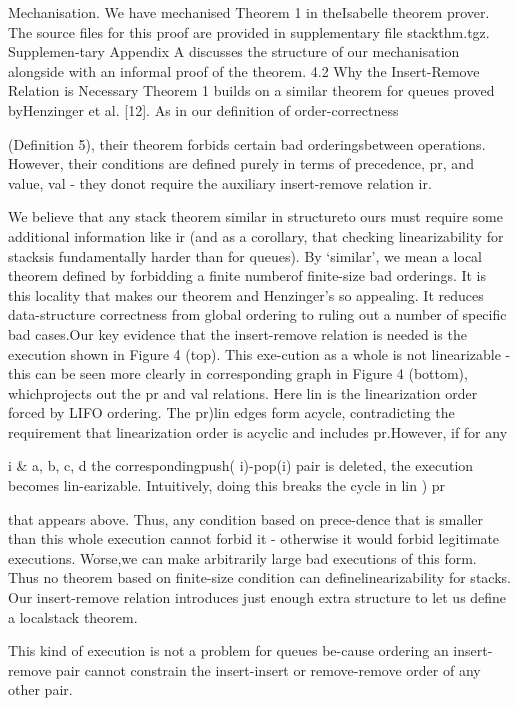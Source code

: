 Mechanisation. We have mechanised Theorem 1 in theIsabelle theorem prover. The source files for this proof are
provided in supplementary file stackthm.tgz. Supplemen-tary Appendix A discusses the structure of our mechanisation alongside with an informal proof of the theorem.
4.2 Why the Insert-Remove Relation is Necessary
Theorem 1 builds on a similar theorem for queues proved byHenzinger et al. [12]. As in our definition of order-correctness

(Definition 5), their theorem forbids certain bad orderingsbetween operations. However, their conditions are defined
purely in terms of precedence, pr, and value, val - they donot require the auxiliary insert-remove relation ir.

We believe that any stack theorem similar in structureto ours must require some additional information like ir
(and as a corollary, that checking linearizability for stacksis fundamentally harder than for queues). By `similar', we
mean a local theorem defined by forbidding a finite numberof finite-size bad orderings. It is this locality that makes
our theorem and Henzinger's so appealing. It reduces data-structure correctness from global ordering to ruling out a
number of specific bad cases.Our key evidence that the insert-remove relation is
needed is the execution shown in Figure 4 (top). This exe-cution as a whole is not linearizable - this can be seen more
clearly in corresponding graph in Figure 4 (bottom), whichprojects out the pr and val relations. Here lin is the linearization order forced by LIFO ordering. The pr)lin edges form acycle, contradicting the requirement that linearization order
is acyclic and includes pr.However, if for any

i & {a, b, c, d} the correspondingpush(
i)-pop(i) pair is deleted, the execution becomes lin-earizable. Intuitively, doing this breaks the cycle in lin ) pr

that appears above. Thus, any condition based on prece-dence that is smaller than this whole execution cannot forbid
it - otherwise it would forbid legitimate executions. Worse,we can make arbitrarily large bad executions of this form.
Thus no theorem based on finite-size condition can definelinearizability for stacks. Our insert-remove relation introduces just enough extra structure to let us define a localstack theorem.

This kind of execution is not a problem for queues be-cause ordering an insert-remove pair cannot constrain the
insert-insert or remove-remove order of any other pair.

